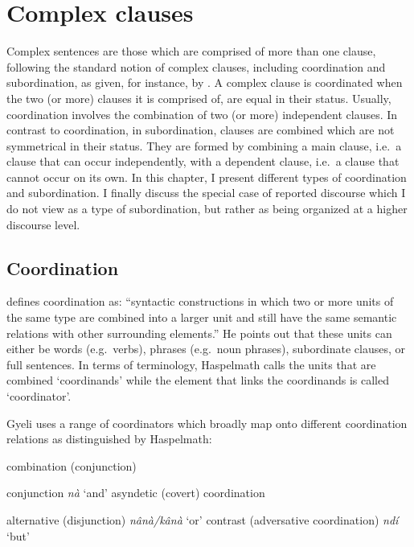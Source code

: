 \chapter{Complex clauses}
\label{sec:CC}

Complex sentences are those which are comprised of more than one clause, following the standard notion of complex clauses, including coordination and subordination, as given, for instance, by \citet{wegener2012}. A complex clause is coordinated when the two (or more) clauses it is comprised of, are equal in their status. Usually, coordination involves the combination of two (or more) independent clauses. In contrast to coordination, in subordination, clauses are combined which are not symmetrical in their status. They are formed by combining a main clause, i.e.\ a clause that can occur independently, with a dependent clause, i.e.\  a clause that cannot occur on its own. In this chapter, I present different types of coordination and subordination. I finally discuss the special case of reported discourse which I do not view as a type of subordination, but rather as being organized at a higher discourse level.


\section{Coordination}
\label{sec:Coord}

\citet[1]{haspelmath2007} defines coordination as:
``syntactic constructions in which two or more units of the same type are combined into a larger unit and still have the same semantic relations with other surrounding elements.''
He points out that these units can either be words (e.g.\ verbs), phrases (e.g.\ noun phrases), subordinate clauses, or full sentences. In terms of terminology, Haspelmath calls the units that are combined `coordinands' while the element that links the coordinands is called `coordinator'.

Gyeli uses a range of coordinators which broadly map onto different coordination relations as distinguished by Haspelmath:
\begin{enumerate}
\itshapeem combination (conjunction)
\begin{itemize}
\itshapeem conjunction {\itshape nà} `and'
\itshapeem asyndetic (covert) coordination
\end{itemize}
\itshapeem alternative (disjunction) {\itshape nânà/kânà} `or'
\itshapeem contrast (adversative coordination) {\itshape ndí} `but'
\end{enumerate}

